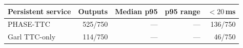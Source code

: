 \begin{tabular}{lrrrr}
\toprule
Persistent service & Outputs & Median p95 & p95 range & $<20$\,ms \\
\midrule
PHASE-TTC & 525/750 & --- & --- & 136/750 \\
Garl TTC-only & 114/750 & --- & --- & 46/750 \\
\bottomrule
\end{tabular}
